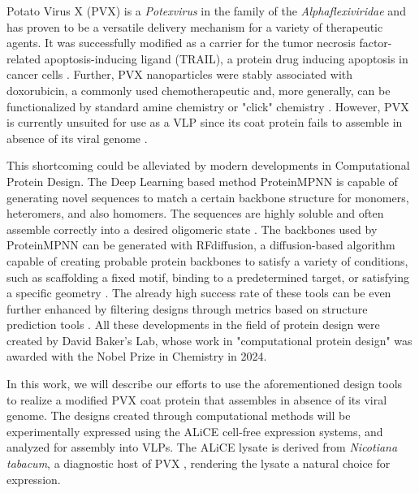 Potato Virus X (PVX) is a \emph{Potexvirus} in the family of the \emph{Alphaflexiviridae} and has proven to be a versatile delivery mechanism for a variety of therapeutic agents. It was successfully modified as a carrier for the tumor necrosis factor-related apoptosis-inducing ligand (TRAIL), a protein drug inducing apoptosis in cancer cells \cite{pvx_trail}. Further, PVX nanoparticles were stably associated with doxorubicin, a commonly used chemotherapeutic \cite{pvx_doxorubicin} and, more generally, can be functionalized by standard amine chemistry or "click" chemistry \cite{pvx_chemical_modification}. However, PVX is currently unsuited for use as a VLP since its coat protein fails to assemble in absence of its viral genome \cite{juli_sagt_keine_assembly}.

This shortcoming could be alleviated by modern developments in Computational Protein Design. The Deep Learning based method ProteinMPNN is capable of generating novel sequences to match a certain backbone structure for monomers, heteromers, and also homomers. The sequences are highly soluble and often assemble correctly into a desired oligomeric state \cite{PMPNN2022}. The backbones used by ProteinMPNN can be generated with RFdiffusion, a diffusion-based algorithm capable of creating probable protein backbones to satisfy a variety of conditions, such as scaffolding a fixed motif, binding to a predetermined target, or satisfying a specific geometry \cite{RFdiffusion}. The already high success rate of these tools can be even further enhanced by filtering designs through metrics based on structure prediction tools \cite{physics_binder_design}. All these developments in the field of protein design were created by David Baker's Lab, whose work in "computational protein design" was awarded with the Nobel Prize in Chemistry in 2024. 

In this work, we will describe our efforts to use the aforementioned design tools to realize a modified PVX coat protein that assembles in absence of its viral genome. The designs created through computational methods will be experimentally expressed using the ALiCE\textsuperscript{\textregistered} cell-free expression systems, and analyzed for assembly into VLPs. The ALiCE\textsuperscript{\textregistered} lysate is derived from \emph{Nicotiana tabacum}, a diagnostic host of PVX \cite{pvx_host_tabacum}, rendering the lysate a natural choice for expression. 